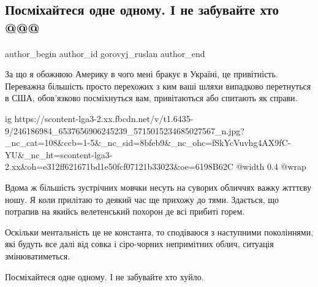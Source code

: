  
 
 
 
 
 
\subsection{Посміхайтеся одне одному. І не забувайте хто @@@}
\label{sec:21_10_2021.fb.gorovyj_ruslan.1.amerika_ulibki}
 
\ifcmt
 author_begin
   author_id gorovyj_ruslan
 author_end
\fi

За що я обожнюю Америку в чого мені бракує в Україні, це привітність. Переважна
більшість просто перехожих з ким ваші шляхи випадково перетнуться в США,
обов’язково посміхнуться вам, привітаються або спитають як справи.

\ifcmt
  ig https://scontent-lga3-2.xx.fbcdn.net/v/t1.6435-9/246186984_6537656906245239_5715015234685027567_n.jpg?_nc_cat=108&ccb=1-5&_nc_sid=8bfeb9&_nc_ohc=fSkYcVuvhg4AX9fC-YU&_nc_ht=scontent-lga3-2.xx&oh=e312ff621671bd1e50fcf07121b33023&oe=6198B62C
  @width 0.4
  @wrap 
\fi

Вдома ж більшість зустрічних мовчки несуть на суворих обличчях важку жтттєву
ношу. Я коли прилітаю то деякий час ще прихожу до тями. Здається, що потрапив
на якийсь велетенський похорон де всі прибиті горем.

Оскільки ментальність це не константа, то сподіваюся з наступними поколіннями,
які будуть все далі від совка і сіро-чорних непримітних облич, ситуація
змінюватиметься. 

Посміхайтеся одне одному. І не забувайте хто хуйло.

